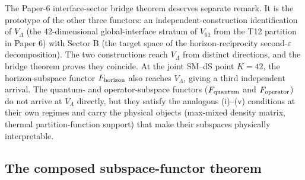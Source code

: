\documentclass[11pt]{article}
\begin{document}
The Paper-6 interface-sector bridge theorem deserves separate remark. It is the prototype of the other three functors: an independent-construction identification of $V_\Lambda$ (the 42-dimensional global-interface stratum of $V_{61}$ from the T12 partition in Paper 6) with Sector B (the target space of the horizon-reciprocity second-$\varepsilon$ decomposition). The two constructions reach $V_\Lambda$ from distinct directions, and the bridge theorem proves they coincide. At the joint SM--dS point $K=42$, the horizon-subspace functor $F_{\rm horizon}$ also reaches $V_\Lambda$, giving a third independent arrival. The quantum- and operator-subspace functors ($F_{\rm quantum}$ and $F_{\rm operator}$) do not arrive at $V_\Lambda$ directly, but they satisfy the analogous (i)--(v) conditions at their own regimes and carry the physical objects (max-mixed density matrix, thermal partition-function support) that make their subspaces physically interpretable.

\subsection{The composed subspace-functor theorem}\label{sec:subspace_functors_unified}
\end{document}
